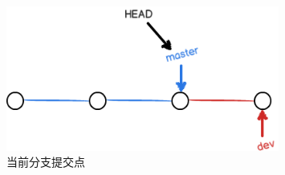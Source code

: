 \begin{figure}[h]
  \centering
  \includegraphics[width=0.8\textwidth]{img/git-br-on-master.png}
  \caption{当前分支提交点}
  \label{fig:git-br-on-master}
\end{figure}